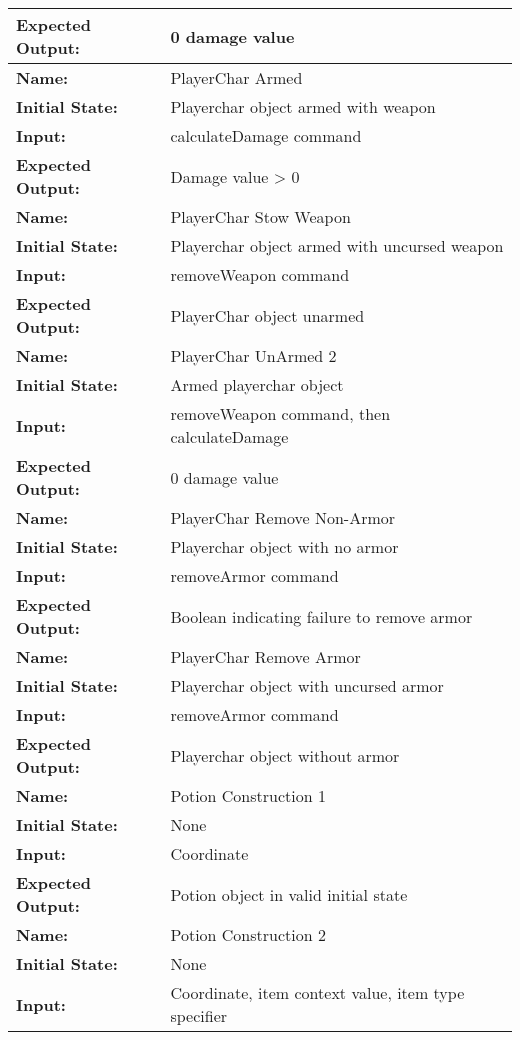 \documentclass[12pt, titlepage]{article}
\begin{document}
\begin{center}
\begin{longtable}{ l | p{10cm} }
				\textbf{Expected Output:} & 0 damage value\\
				\hline
				\textbf{Name:} & PlayerChar Armed\\
				\textbf{Initial State:} & Playerchar object armed with weapon\\
				\textbf{Input:} & calculateDamage command\\
				\textbf{Expected Output:} & Damage value > 0\\
				\hline
				\textbf{Name:} & PlayerChar Stow Weapon\\
				\textbf{Initial State:} & Playerchar object armed with uncursed weapon\\
				\textbf{Input:} & removeWeapon command\\
				\textbf{Expected Output:} & PlayerChar object unarmed\\
				\hline
				\textbf{Name:} & PlayerChar UnArmed 2\\
				\textbf{Initial State:} & Armed playerchar object\\
				\textbf{Input:} & removeWeapon command, then calculateDamage\\
				\textbf{Expected Output:} & 0 damage value\\
				\hline
				\textbf{Name:} & PlayerChar Remove Non-Armor\\
				\textbf{Initial State:} & Playerchar object with no armor\\
				\textbf{Input:} & removeArmor command\\
				\textbf{Expected Output:} & Boolean indicating failure to remove armor\\
				\hline
				\textbf{Name:} & PlayerChar Remove Armor\\
				\textbf{Initial State:} & Playerchar object with uncursed armor\\
				\textbf{Input:} & removeArmor command\\
				\textbf{Expected Output:} & Playerchar object without armor\\
				\hline
				\textbf{Name:} & Potion Construction 1\\
				\textbf{Initial State:} & None\\
				\textbf{Input:} & Coordinate\\
				\textbf{Expected Output:} & Potion object in valid initial state\\
				\hline
				\textbf{Name:} & Potion Construction 2\\
				\textbf{Initial State:} & None\\
				\textbf{Input:} & Coordinate, item context value, item type specifier\\

\end{longtable}
\end{center}
\end{document}
